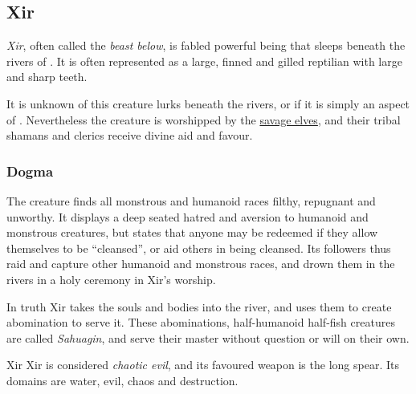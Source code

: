 \subsection{Xir}
\label{sec:Xir}

\emph{Xir}, often called the \emph{beast below}, is fabled powerful being that
sleeps beneath the rivers of . It is often represented as a
large, finned and gilled reptilian with large and sharp teeth.

It is unknown of this creature lurks beneath the rivers, or if it is simply an
aspect of . Nevertheless the creature is worshipped by the
\hyperref[sec:Savage Elves]{savage elves}, and their tribal shamans and clerics
receive divine aid and favour.

\subsubsection{Dogma}

The creature finds all monstrous and humanoid races filthy, repugnant and
unworthy. It displays a deep seated hatred and aversion to humanoid and
monstrous creatures, but states that anyone may be redeemed if they allow
themselves to be ``cleansed'', or aid others in being cleansed. Its followers
thus raid and capture other humanoid and monstrous races, and drown them in
the rivers in a holy ceremony in Xir's worship.

In truth Xir takes the souls and bodies into the river, and uses them to create
abomination to serve it. These abominations, half-humanoid half-fish creatures
are called \emph{Sahuagin}, and serve their master without question or will on
their own.

\begin{35e}{Xir}
  Xir is considered \emph{chaotic evil}, and its favoured weapon is the long
  spear. Its domains are water, evil, chaos and destruction.
\end{35e}

